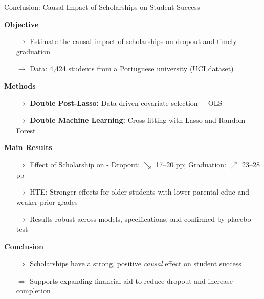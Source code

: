 \documentclass[aspectratio=169]{beamer}
\begin{document}
\begin{frame}{Conclusion: Causal Impact of Scholarships on Student Success}
	
	\textbf{Objective} 
	\vspace{-5pt}
\begin{itemize}
    \item[$\rightarrow$] Estimate the causal impact of scholarships on dropout and timely graduation
    \item[$\rightarrow$] Data: 4,424 students from a Portuguese university (UCI dataset)
\end{itemize}
	\vspace{-5pt}
	
	\textbf{Methods}
	\vspace{-5pt}
	\begin{itemize}
	\item[$\rightarrow$] \textbf{Double Post-Lasso:} Data-driven covariate selection + OLS
    \item[$\rightarrow$] \textbf{Double Machine Learning:} Cross-fitting with Lasso and Random Forest
	\end{itemize}
	\vspace{-5pt}
	
	\textbf{Main Results}
	\vspace{-5pt}
	\begin{itemize}
	    \item[$\Rightarrow$] Effect of Scholarship on - \underline{Dropout:} $\searrow$ 17–20 pp; \underline{Graduation:} $\nearrow$ 23–28 pp
    \item[$\rightarrow$] HTE: Stronger effects for older students with lower parental educ and weaker prior grades
    \item[$\rightarrow$] Results robust across models, specifications, and confirmed by placebo test
	\end{itemize}
	\vspace{-5pt}

	\textbf{Conclusion}
	\vspace{-5pt}
	\begin{itemize}
	 \item[$\Rightarrow$] Scholarships have a strong, positive \textit{causal} effect on student success
    \item[$\Rightarrow$] Supports expanding financial aid to reduce dropout and increase completion	
    \end{itemize}
	
\end{frame}
\end{document}
